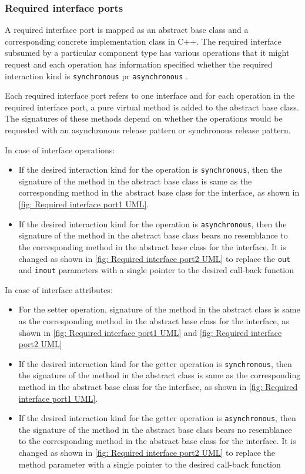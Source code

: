 \subsubsection{\textbf{Required interface ports}}
A required interface port is mapped as an abstract base class and a corresponding concrete implementation class in C++. The required interface subsumed by a particular component type has various operations that it might request and each operation has information specified whether the required interaction kind is \texttt{synchronous} pr \texttt{asynchronous} \cite{SpecMetamodel,CompBasedProcess}. 

Each required interface port refers to one interface and for each operation in the required interface port, a pure virtual method is added to the abstract base class. The signatures of these methods depend on whether the operations would be requested with an asynchronous release pattern or synchronous release pattern.

In case of interface operations:
\begin{itemize}
\item If the desired interaction kind for the operation is \texttt{synchronous}, then the signature of the method in the abstract base class is same as the corresponding method in the abstract base class for the interface, as shown in \cref{fig: Required interface port1 UML}.
\item If the desired interaction kind for the operation is \texttt{asynchronous}, then the signature of the method in the abstract base class bears no resemblance to the corresponding method in the abstract base class for the interface. It is changed as shown in \cref{fig: Required interface port2 UML} to replace the \texttt{out} and \texttt{inout} parameters with a single pointer to the desired call-back function 
\end{itemize}

In case of interface attributes:
\begin{itemize}
\item For the setter operation, signature of the method in the abstract class is same as the corresponding method in the abstract base class for the interface, as shown in \cref{fig: Required interface port1 UML} and \cref{fig: Required interface port2 UML}
\item If the desired interaction kind for the getter operation is \texttt{synchronous}, then the signature of the method in the abstract class is same as the corresponding method in the abstract base class for the interface, as shown in \cref{fig: Required interface port1 UML}. 
\item If the desired interaction kind for the getter operation is \texttt{asynchronous}, then the signature of the method in the abstract base class bears no resemblance to the corresponding method in the abstract base class for the interface. It is changed as shown in \cref{fig: Required interface port2 UML} to replace the method parameter with a single pointer to the desired call-back function  
\end{itemize} 

